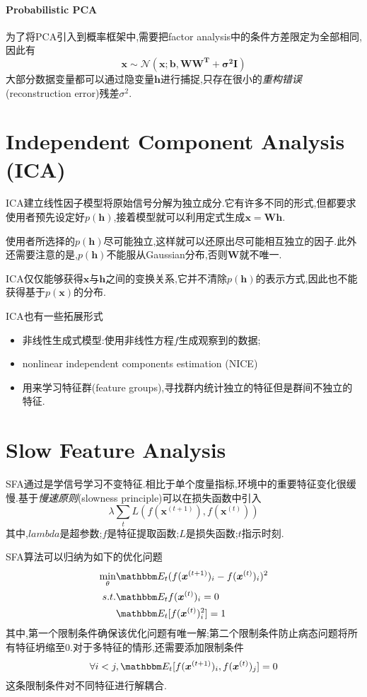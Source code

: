 \paragraph{Probabilistic PCA}

为了将PCA引入到概率框架中,需要把factor analysis中的条件方差限定为全部相同,因此有
\begin{equation}
\bm x\sim\mathcal N(\bm{x;b,WW^T+\sigma^2I})
\end{equation}
大部分数据变量都可以通过隐变量$\bm h$进行捕捉,只存在很小的\textit{重构错误}(reconstruction error)残差$\sigma^2$.

\section{Independent Component Analysis (ICA)}

ICA建立线性因子模型将原始信号分解为独立成分.它有许多不同的形式,但都要求使用者预先设定好$p(\bm h)$,接着模型就可以利用定式生成$\bm{x=Wh}$.

使用者所选择的$p(\bm h)$尽可能独立,这样就可以还原出尽可能相互独立的因子.此外还需要注意的是,$p(\bm h)$不能服从Gaussian分布,否则$\bm W$就不唯一.

ICA仅仅能够获得$\bm x$与$\bm h$之间的变换关系,它并不清除$p(\bm h)$的表示方式,因此也不能获得基于$p(\bm x)$的分布.

ICA也有一些拓展形式
\begin{itemize}
    \item 非线性生成式模型:使用非线性方程$f$生成观察到的数据;
    \item nonlinear independent components estimation (NICE)
    \item 用来学习特征群(feature groups),寻找群内统计独立的特征但是群间不独立的特征.
\end{itemize}

\section{Slow Feature Analysis}

SFA通过是学信号学习不变特征.相比于单个度量指标,环境中的重要特征变化很缓慢.基于\textit{慢速原则}(slowness principle)可以在损失函数中引入
\begin{equation}
\lambda\sum_tL(f(\bm x^{(t+1)}),f(\bm x^{(t)}))
\end{equation}
其中,$lambda$是超参数;$f$是特征提取函数;$L$是损失函数;$t$指示时刻.

SFA算法可以归纳为如下的优化问题
\begin{equation}\begin{split}
\min_{\theta}&\mathbbm E_t(f(\bm x^{(t+1)})_i-f(\bm x^{(t)})_i)^2\\
s.t.&\mathbbm E_tf(\bm x^{(t)})_i=0\\
&\mathbbm E_t[f(\bm x^{(t)})_i^2]=1
\end{split}\end{equation}
其中,第一个限制条件确保该优化问题有唯一解;第二个限制条件防止病态问题将所有特征坍缩至$0$.对于多特征的情形,还需要添加限制条件
\begin{equation}
\forall i<j,\mathbbm E_t[f(\bm x^{(t+1)})_i,f(\bm x^{(t)})_j]=0
\end{equation}
这条限制条件对不同特征进行解耦合.

